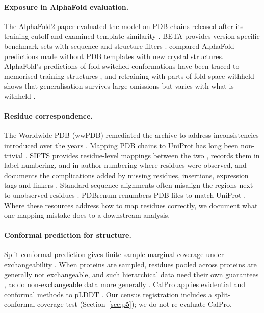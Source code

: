 \documentclass{article}
\begin{document}
\paragraph{Exposure in AlphaFold evaluation.} The AlphaFold2 paper evaluated
the model on PDB chains released after its training cutoff and examined
template similarity \citep{jumper2021}. BETA provides version-specific
benchmark sets with sequence and structure filters \citep{dobson2025beta}.
\citet{terwilliger2024} compared AlphaFold predictions made without PDB
templates with new crystal structures. AlphaFold's predictions of
fold-switched conformations have been traced to memorised training
structures \citep{chakravarty2024}, and retraining with parts of fold space
withheld shows that generalisation survives large omissions but varies with
what is withheld \citep{ahdritz2024}.

\paragraph{Residue correspondence.} The Worldwide PDB (wwPDB) remediated the
archive to address inconsistencies introduced over the years
\citep{henrick2008}. Mapping PDB chains to UniProt has long been non-trivial
\citep{martin2005}. SIFTS provides residue-level mappings between the two
\citep{velankar2013,dana2019}, records them in label numbering, and in
author numbering where residues were observed, and documents
the complications added by missing residues, insertions, expression tags and
linkers \citep{choudhary2023sifts}. Standard sequence alignments often
misalign the regions next to unobserved residues \citep{velankar2013}.
PDBrenum renumbers PDB files to match UniProt \citep{faezov2021pdbrenu}.
Where these resources address how to map residues correctly, we document
what one mapping mistake does to a downstream analysis.

\paragraph{Conformal prediction for structure.} Split conformal prediction
gives finite-sample marginal coverage under exchangeability
\citep{vovk2005,lei2018,angelopoulos2023}. When proteins are sampled, residues pooled across proteins are generally not exchangeable, and such hierarchical data need their own guarantees \citep{dunn2023,lee2023}, as do non-exchangeable
data more generally \citep{barber2023}. CalPro applies evidential and
conformal methods to pLDDT \citep{shihab2026calpro}. Our census
registration includes a split-conformal coverage test
(Section~\ref{sec:p5}); we do not re-evaluate CalPro.
\end{document}
